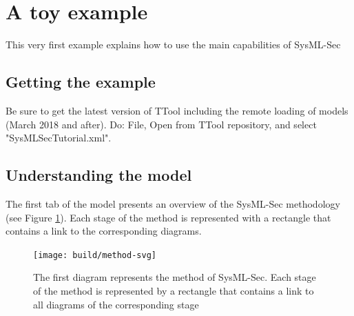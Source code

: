 \documentclass[12pt]{article}
\begin{document}
\newpage
\section{A toy example}\label{sec:example}
This very first example explains how to use the main capabilities of SysML-Sec

\subsection{Getting the example}
Be sure to get the latest version of TTool including the remote loading of models (March 2018 and after). Do: File, Open from TTool repository, and select "SysMLSecTutorial.xml".

\subsection{Understanding the model}
The first tab of the model presents an overview of the SysML-Sec methodology (see Figure \ref{fig:method}). Each stage of the method is represented with a rectangle that contains a link to the corresponding diagrams. 


\begin{figure}[htbp]
\centering
\texttt{[image: build/method-svg]}

\caption{The first diagram represents the method of SysML-Sec. Each stage of the method is represented by a rectangle that contains a link to all diagrams of the corresponding stage} \label{fig:method}
\end{figure}
\end{document}
